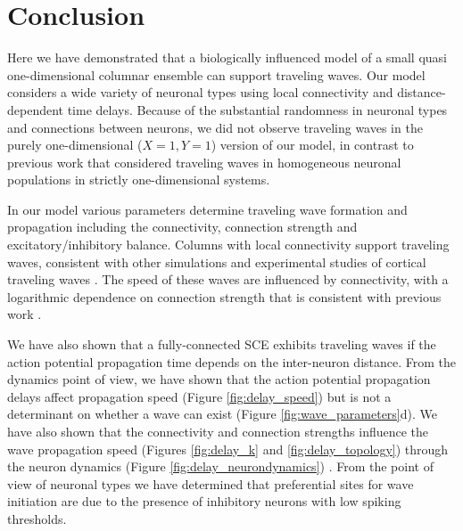 
\chapter{Conclusion}

Here we have demonstrated that a biologically influenced model of a small quasi one-dimensional columnar ensemble  can support traveling waves. 
Our model considers a wide variety of neuronal types using local connectivity and distance-dependent time delays.
Because of the substantial randomness in neuronal types and connections between neurons, we did not observe traveling waves in the purely one-dimensional ($X=1,Y=1$) version of our model, 
in contrast to previous work that considered traveling waves in homogeneous neuronal populations in strictly one-dimensional systems. 

In our model various parameters determine traveling wave formation and propagation including the connectivity, connection strength and excitatory/inhibitory balance.
Columns with local connectivity support traveling waves, consistent with other simulations and experimental studies of cortical traveling waves \citep{Kopell1986}\citep{ermentrout2001}\citep{Golomb1999} .
The speed of these waves are influenced by connectivity, with a logarithmic dependence on connection strength that is consistent with previous work \citep{Golomb1996}\citep{Golomb1999}.

We have also shown that  a fully-connected SCE exhibits traveling waves if the action potential propagation time depends on the inter-neuron distance. 
From the dynamics point of view, we have shown that the action potential propagation delays affect propagation speed (Figure \ref{fig:delay_speed}) but is not a determinant on whether a wave can exist 
(Figure \ref{fig:wave_parameters}d).
We have also shown that  the connectivity and connection strengths influence the wave propagation speed (Figures \ref{fig:delay_k} and \ref{fig:delay_topology}) 
through the neuron dynamics (Figure \ref{fig:delay_neurondynamics}) .
From the point of view of neuronal types  we have determined that preferential sites for wave initiation are due to the presence of inhibitory neurons with low spiking thresholds.


